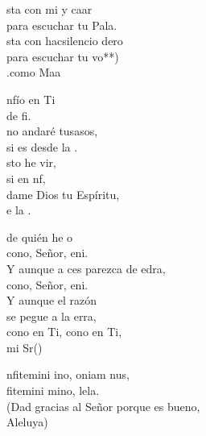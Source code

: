 \documentclass[12pt]{article}
\begin{document}
\begin{multicols*}{2}
\begin{cancion}%
	sta con mi y caar\\
	para escuchar tu Pala.\\
	sta con hacsilencio dero\\
	para escuchar tu vo**)\\
	.como Maa\\
\end{cancion}%

\begin{cancion}%
	nfío en Ti\\
	de  fi.\\
	no andaré tusasos,\\
	si es desde la .\\
	sto he  vir,\\
	si en nf, \\
dame Dios tu Espíritu,\\
	e  la . \\
\end{cancion}%

\begin{cancion}[Confío][Ixcís]%
	 de quién he o \\
	cono, Señor, eni. \\
	Y aunque a ces parezca de edra,\\
	cono, Señor, eni. \\
	Y aunque el razón\\
	se pegue a la erra,\\
	cono en Ti, cono en Ti,   \\
	mi Sr()\\
\end{cancion}%

\begin{cancion}[Confitemini][Taizé]%
	nfitemini ino, oniam nus,\\
	fitemini mino, lela.\\
(Dad gracias al Señor porque es bueno,\\
 Aleluya)\\
\end{cancion}%


\end{multicols*}
\end{document}
